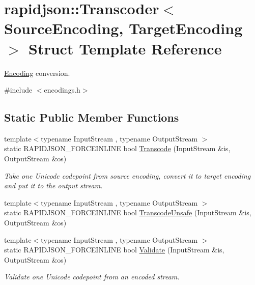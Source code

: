 \hypertarget{structrapidjson_1_1_transcoder}{}\section{rapidjson\+::Transcoder$<$ Source\+Encoding, Target\+Encoding $>$ Struct Template Reference}
\label{structrapidjson_1_1_transcoder}


\mbox{\hyperlink{classrapidjson_1_1_encoding}{Encoding}} conversion.  




{\ttfamily \#include $<$encodings.\+h$>$}

\subsection*{Static Public Member Functions}
\begin{DoxyCompactItemize}
\item 
{\footnotesize template$<$typename Input\+Stream , typename Output\+Stream $>$ }\\static R\+A\+P\+I\+D\+J\+S\+O\+N\+\_\+\+F\+O\+R\+C\+E\+I\+N\+L\+I\+NE bool \mbox{\hyperlink{structrapidjson_1_1_transcoder_a3a1de7069d3cf7f1d4f4e2f96ceb7664}{Transcode}} (Input\+Stream \&is, Output\+Stream \&os)
\begin{DoxyCompactList}\small\item\em Take one Unicode codepoint from source encoding, convert it to target encoding and put it to the output stream. \end{DoxyCompactList}\item 
{\footnotesize template$<$typename Input\+Stream , typename Output\+Stream $>$ }\\static R\+A\+P\+I\+D\+J\+S\+O\+N\+\_\+\+F\+O\+R\+C\+E\+I\+N\+L\+I\+NE bool \mbox{\hyperlink{structrapidjson_1_1_transcoder_a43f7d4e8a24db9d09958b9be41257033}{Transcode\+Unsafe}} (Input\+Stream \&is, Output\+Stream \&os)
\item 
{\footnotesize template$<$typename Input\+Stream , typename Output\+Stream $>$ }\\static R\+A\+P\+I\+D\+J\+S\+O\+N\+\_\+\+F\+O\+R\+C\+E\+I\+N\+L\+I\+NE bool \mbox{\hyperlink{structrapidjson_1_1_transcoder_ae9178e512e99394a38785e73927140da}{Validate}} (Input\+Stream \&is, Output\+Stream \&os)
\begin{DoxyCompactList}\small\item\em Validate one Unicode codepoint from an encoded stream. \end{DoxyCompactList}\end{DoxyCompactItemize}


